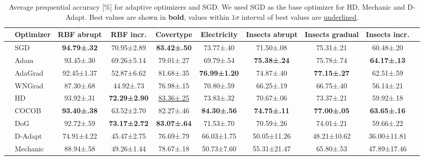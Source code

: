 \documentclass[runningheads]{llncs}
\begin{document}
\begin{table}[ht]
	\centering
	\small
	\begin{tabular}{llcccccccc}
		\toprule
		                                                   & Optimizer & RBF abrupt          & RBF incr.            & Covertype             & Electricity          & Insects abrupt      & Insects gradual     & Insects incr.       \\
		\midrule
		\multirow{5}{*}{\rotatebox[origin=c]{90}{Tuned}}   & SGD       & \bfseries 94.79±.32 & 70.95±2.89           & \bfseries 83.42±.50   & 73.77±.40            & 71.50±.08           & 75.31±.21           & 60.48±.20           \\
		                                                   & Adam      & 93.45±.30           & 69.26±5.14           & 79.01±.27             & 69.79±.54            & \bfseries 75.38±.24 & 75.78±.74           & \bfseries 64.17±.13 \\
		                                                   & AdaGrad   & 92.45±1.37          & 52.87±6.62           & 81.68±.35             & \bfseries 76.99±1.20 & 74.87±.40           & \bfseries 77.15±.27 & 62.51±.59           \\
		                                                   & WNGrad    & 87.30±.68           & 44.92±.73            & 76.98±.15             & 70.80±.59            & 66.25±.19           & 66.75±.40           & 56.14±.21           \\
		                                                   & HD        & 93.92±.31           & \bfseries 72.29±2.90 & \underline{83.36±.25} & 73.83±.32            & 70.67±.06           & 73.37±.21           & 59.92±.18           \\ \midrule
		\multirow{4}{*}{\rotatebox[origin=c]{90}{LR-Free}} & COCOB     & \bfseries 93.40±.38 & 63.52±2.70           & 82.27±.46             & \bfseries 84.30±.56  & \bfseries 74.75±.11 & \bfseries 77.00±.05 & \bfseries 63.65±.16 \\
		                                                   & DoG       & 92.72±.59           & \bfseries 73.17±2.72 & \bfseries 83.07±.64   & 71.53±.70            & 70.59±.26           & 74.01±.21           & 59.66±.22           \\
		                                                   & D-Adapt   & 74.91±4.22          & 45.47±2.75           & 76.69±.79             & 66.03±1.75           & 50.05±11.26         & 48.21±10.62         & 36.00±11.81         \\
		                                                   & Mechanic  & 88.94±.58           & 49.26±1.44           & 78.67±.18             & 50.73±7.60           & 55.31±21.47         & 65.80±.53           & 47.89±17.46         \\
		\bottomrule
	\end{tabular}
	\caption{Average prequential accuracy [\%] for adaptive optimizers and SGD. We used SGD as the base optimizer for HD, Mechanic and D-Adapt. Best values are shown in \textbf{bold}, values within $1\sigma$ interval of best values are \underline{underlined}.}
	\label{tab:results_adaptive_optims}
\end{table}
\end{document}
